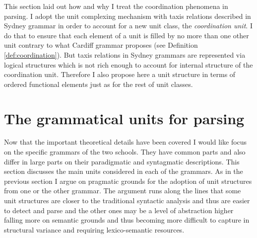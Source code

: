 

This section laid out how and why I treat the coordination phenomena in parsing. I adopt the unit complexing mechanism with taxis relations described in Sydney grammar in order to account for a new unit class, the \textit{coordination unit}. I do that to ensure that each element of a unit is filled by no more than one other unit contrary to what Cardiff grammar proposes (see Definition \ref{def:coordination}). But taxis relations in Sydney grammars are represented via logical structures which is not rich enough to account for internal structure of the coordination unit. Therefore I also propose here a unit structure in terms of ordered functional elements just as for the rest of unit classes. 

\section{The grammatical units for parsing}
\label{sec:discussion-unit-classes}

Now that the important theoretical details have been covered I would like focus on the specific grammars of the two schools. They have common parts and also differ in large parts on their paradigmatic and syntagmatic descriptions. This section discusses the main units considered in each of the grammars. As in the previous section I argue on pragmatic grounds for the adoption of unit structures from one or the other grammar. The argument runs along the lines that some unit structures are closer to the traditional syntactic analysis and thus are easier to detect and parse and the other ones may be a level of abstraction higher falling more on semantic grounds and thus becoming more difficult to capture in structural variance and requiring lexico-semantic resources.

